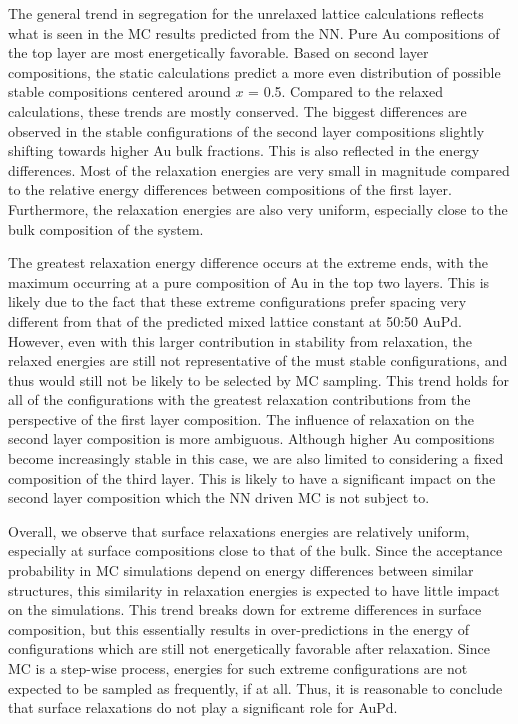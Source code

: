 \documentclass[12pt]{cmuthesis}
\begin{document}
The general trend in segregation for the unrelaxed lattice calculations reflects what is seen in the MC results predicted from the NN. Pure Au compositions of the top layer are most energetically favorable. Based on second layer compositions, the static calculations predict a more even distribution of possible stable compositions centered around \(x\) = 0.5. Compared to the relaxed calculations, these trends are mostly conserved. The biggest differences are observed in the stable configurations of the second layer compositions slightly shifting towards higher Au bulk fractions. This is also reflected in the energy differences. Most of the relaxation energies are very small in magnitude compared to the relative energy differences between compositions of the first layer. Furthermore, the relaxation energies are also very uniform, especially close to the bulk composition of the system.

The greatest relaxation energy difference occurs at the extreme ends, with the maximum occurring at a pure composition of Au in the top two layers. This is likely due to the fact that these extreme configurations prefer spacing very different from that of the predicted mixed lattice constant at 50:50 AuPd. However, even with this larger contribution in stability from relaxation, the relaxed energies are still not representative of the must stable configurations, and thus would still not be likely to be selected by MC sampling. This trend holds for all of the configurations with the greatest relaxation contributions from the perspective of the first layer composition. The influence of relaxation on the second layer composition is more ambiguous. Although higher Au compositions become increasingly stable in this case, we are also limited to considering a fixed composition of the third layer. This is likely to have a significant impact on the second layer composition which the NN driven MC is not subject to.

Overall, we observe that surface relaxations energies are relatively uniform, especially at surface compositions close to that of the bulk. Since the acceptance probability in MC simulations depend on energy differences between similar structures, this similarity in relaxation energies is expected to have little impact on the simulations. This trend breaks down for extreme differences in surface composition, but this essentially results in over-predictions in the energy of configurations which are still not energetically favorable after relaxation. Since MC is a step-wise process, energies for such extreme configurations are not expected to be sampled as frequently, if at all. Thus, it is reasonable to conclude that surface relaxations do not play a significant role for AuPd.
\end{document}
